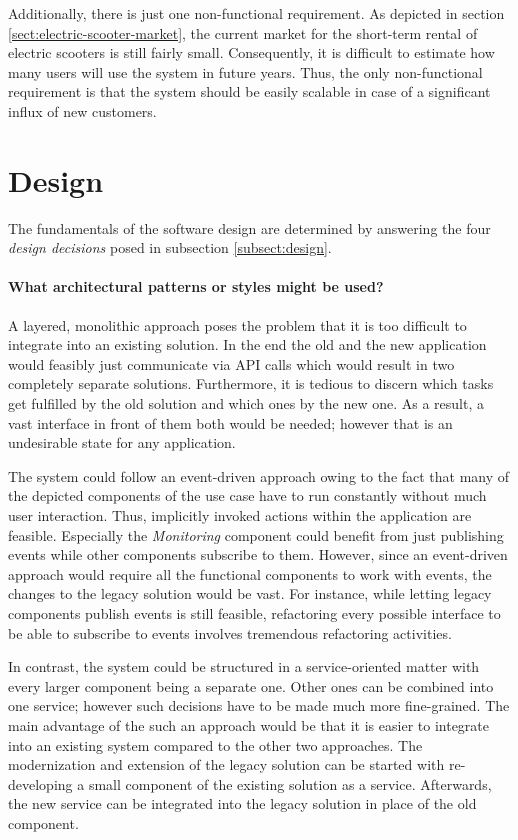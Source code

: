 \documentclass[12pt,a4paper,twoside]{report}
\begin{document}
Additionally, there is just one non-functional requirement.
As depicted in section \ref{sect:electric-scooter-market}, the current market
for the short-term rental of electric scooters is still fairly small.
Consequently, it is difficult to estimate how many users will use the system
in future years. Thus, the only non-functional requirement is that the system
should be easily scalable in case of a significant influx of new customers.


\section{Design}

The fundamentals of the software design are determined by answering the four
\textit{design decisions} posed in subsection \ref{subsect:design}.

\paragraph{What architectural patterns or styles might be used?}
A layered, monolithic approach poses the problem that it is too difficult
to integrate into an existing solution. In the end the old and the new
application would feasibly just communicate via API calls which would result
in two completely separate solutions. Furthermore, it is tedious to discern
which tasks get fulfilled by the old solution and which ones by the new one.
As a result, a vast interface in front of them both would be needed;
however that is an undesirable state for any application.

The system could follow an event-driven approach owing to the fact that
many of the depicted components of the use case have to run constantly without
much user interaction. Thus, implicitly invoked actions within the application
are feasible. Especially the \textit{Monitoring} component could benefit from
just publishing events while other components subscribe to them.
However, since an event-driven approach would require all the
functional components to work with events, the changes to the legacy solution
would be vast. For instance, while letting legacy components publish events
is still feasible, refactoring every possible interface to be able
to subscribe to events involves tremendous refactoring activities.

In contrast, the system could be structured in a service-oriented matter with
every larger component being a separate one. Other ones can be combined into
one service; however such decisions have to be made much more fine-grained.
The main advantage of the such an approach would be that it is easier to
integrate into an existing system compared to the other two approaches.
The modernization and extension of the legacy solution can be started with
re-developing a small component of the existing solution as a service.
Afterwards, the new service can be integrated into the legacy solution
in place of the old component.
\end{document}
